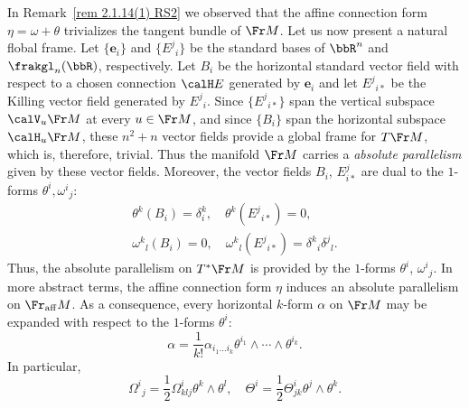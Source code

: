 \begin{rem}\label{rem 2.1.14(2) RS2}
    In Remark~\ref{rem 2.1.14(1) RS2} we observed that the affine connection form $\eta=\omega+\theta$ trivializes the tangent bundle of $\Fr M$. Let us now present a natural flobal frame. Let $\{\bm{e}_i\}$ and $\{E^j{}_i\}$ be the standard bases of $\bbR^n$ and $\frakgl_n(\bbR)$, respectively. Let $B_i$ be the horizontal standard vector field with respect to a chosen connection $\calH E$ generated by $\bm{e}_i$ and let $E^j{}_{i\ast}$ be the Killing vector field generated by $E^j{}_i$. Since $\{E^j{}_{i\ast}\}$ span the vertical subspace $\calV_u \Fr M$ at every $u\in\Fr M$, and since $\{B_i\}$ span the horizontal subspace $\calH_u \Fr M$, these $n^2+n$ vector fields provide a global frame for $T\Fr M$, which is, therefore, trivial. Thus the manifold $\Fr M$ carries a \emph{absolute parallelism} given by these vector fields. Moreover, the vector fields $B_i$, $E^j_{i\ast}$ are dual to the $1$-forms $\theta^i,\omega^i{}_j$:
    \begin{gather}
        \theta^k(B_i)=\delta^k_i,\quad \theta^k(E^j{}_{i\ast})=0,\\
        \omega^k{}_l(B_i)=0,\quad \omega^k{}_l(E^j{}_{i\ast})=\delta^k{}_i\delta^j{}_l.
    \end{gather}
    Thus, the absolute parallelism on $T^\ast\Fr M$ is provided by the $1$-forms $\theta^i$, $\omega^i{}_j$. In more abstract terms, the affine connection form $\eta$ induces an absolute parallelism on $\Fr_{\mathrm{aff}}M$. As a consequence, every horizontal $k$-form $\alpha$ on $\Fr M$ may be expanded with respect to the $1$-forms $\theta^i$:
    \[\alpha=\frac{1}{k!}\alpha_{i_1\ldots i_k}\theta^{i_1}\wedge \cdots\wedge \theta^{i_k}.\]
    In particular, 
    \[\Omega^i{}_j=\frac12 \Omega^i_{klj}\theta^k\wedge\theta^l,\quad \Theta^i=\frac12\Theta^i_{jk}\theta^j\wedge\theta^k.\label{eq 2.1.20 RS2}\]
\end{rem}

